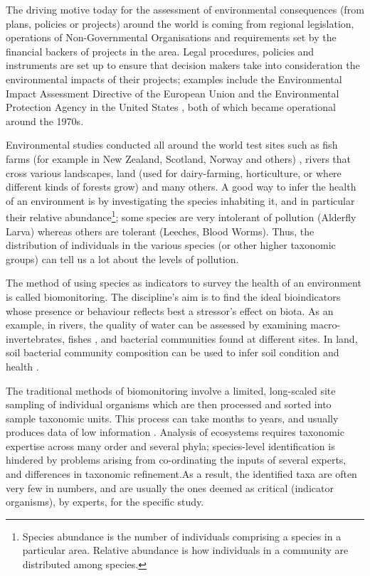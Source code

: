  The driving motive today for the assessment of environmental consequences (from plans, policies or projects) around the world is coming from regional legislation, operations of Non-Governmental Organisations and requirements set by the financial backers of projects in the area. Legal procedures, policies and instruments are set up to ensure that decision makers take into consideration the environmental impacts of their projects; examples include the Environmental Impact Assessment Directive of the European Union \cite{eia_eu} and the Environmental Protection Agency in the United States \cite{us_epa_our_2013}, both of which became operational around the 1970s.
 
 

Environmental studies conducted all around the world test sites such as fish farms (for example in New Zealand, Scotland, Norway and others) \cite{stoeck_environmental_2018}, rivers that cross various landscapes, land (used for dairy-farming, horticulture, or where different kinds of forests grow)\cite{hermans_bacteria_2016} and many others. A good way to infer the health of an environment is by investigating the species inhabiting it, and in particular their relative abundance\footnote{Species abundance is the number of individuals comprising a species in a particular area. Relative abundance is how individuals in a community are distributed among species.}; some species are very intolerant of pollution (Alderfly Larva) whereas others are tolerant (Leeches, Blood Worms). Thus, the distribution of individuals in the various species (or other higher taxonomic groups) can tell us a lot about the levels of pollution. 

The method of using species as indicators to survey the health of an environment is called biomonitoring. The discipline's aim is to find the ideal bioindicators whose presence or behaviour reflects best a stressor's effect on biota. As an example, in rivers, the quality of water can be assessed by examining macro-invertebrates, fishes \cite{bioindicatorsinrivers}, and bacterial communities \cite{stoeck_environmental_2018} found at different sites. In land, soil bacterial community composition can be used to infer soil condition and health \cite{hermans_bacteria_2016}.

The traditional methods of biomonitoring involve a limited, long-scaled site sampling of individual organisms which are then processed and sorted into sample taxonomic units. This process can take months to years, and usually produces data of low information \cite{baird_biomonitoring_2012}. Analysis of ecosystems requires taxonomic expertise across many order and several phyla; species-level identification is hindered by problems arising from co-ordinating the inputs of several experts, and differences in taxonomic refinement.As a result, the identified taxa are often very few in numbers, and are usually the ones deemed as critical (indicator organisms), by experts, for the specific study\cite{cranston_biomonitoring_1990}. 

